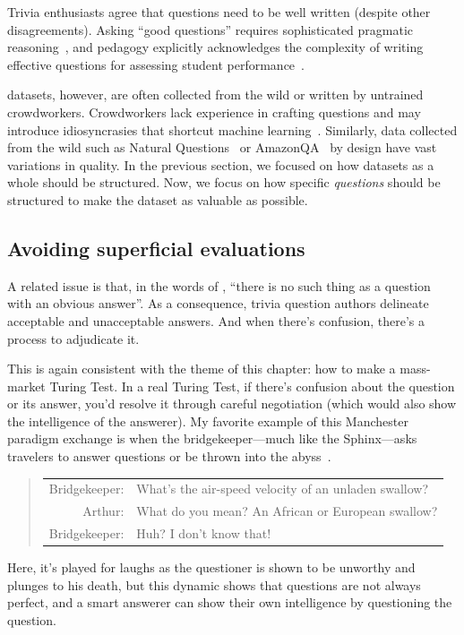 Trivia enthusiasts agree that questions need to be well written
(despite other disagreements).
%
Asking ``good questions'' requires sophisticated pragmatic
reasoning~\citep{hawkins-15}, and pedagogy explicitly acknowledges the
complexity of writing effective questions for assessing student
performance~\citep[focusing on multiple choice
questions]{haladyna-04}.

 datasets, however, are often collected from the wild or written by untrained
crowdworkers.
Crowdworkers lack experience in crafting questions and may introduce
idiosyncrasies that shortcut machine learning~\citep{geva-19}.
Similarly, data collected from the wild
such as Natural Questions~\citep{kwiatkowski-19} or
AmazonQA~\citep{gupta-19} by design have vast variations in quality.
%
In the previous section, we focused on how datasets as a whole should
be structured.
%
Now, we focus on how specific \emph{questions} should be structured to
make the dataset as valuable as possible.

\subsection{Avoiding superficial evaluations}

A related issue is that, in the words of \citet{voorhees-00}, ``there is no such
thing as a question with an obvious answer''.
As a consequence, trivia question authors 
delineate acceptable and unacceptable answers.
%
And when there's confusion, there's a process to adjudicate it.

This is again consistent with the theme of this chapter: how to make a
mass-market Turing Test.
%
In a real Turing Test, if there's confusion about the question or its
answer, you'd resolve it through careful negotiation (which would also
show the intelligence of the answerer).
%
My favorite example of this Manchester paradigm exchange is when the
bridgekeeper---much like the Sphinx---asks travelers to answer questions or be
thrown into the abyss~\citep{monty-python-holy-grail}.
\begin{quote}\small
  \begin{tabular}{rp{}}
  Bridgekeeper: & What's the air-speed velocity of an unladen swallow? \\
  Arthur: & What do you mean? An African or European swallow? \\
  Bridgekeeper: & Huh? I don't know that! \\
  \end{tabular}
\end{quote}
Here, it's played for laughs as the questioner is shown to be unworthy
and plunges to his death, but this dynamic shows that questions are not
always perfect, and a smart answerer can show their own intelligence by
questioning the question.

